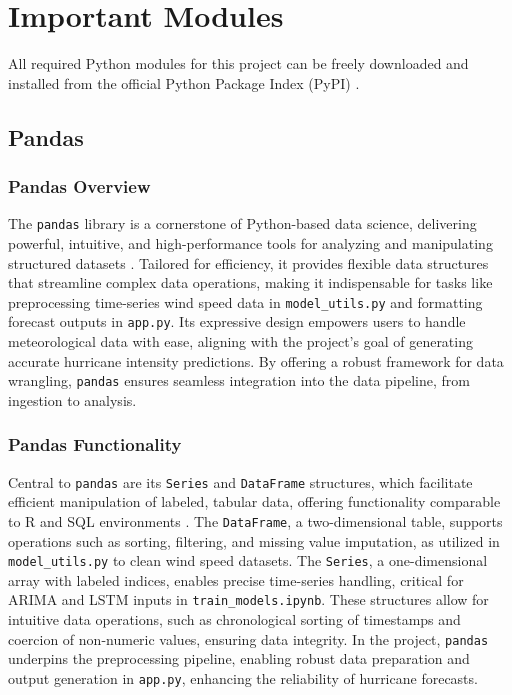 %
%
%

\chapter{Important Modules}

All required Python modules for this project can be freely downloaded and installed from the official Python Package Index (PyPI) \cite{pythonpypi}.


\section{Pandas}
\subsection{Pandas Overview}
The \texttt{pandas} library is a cornerstone of Python-based data science, delivering powerful, intuitive, and high-performance tools for analyzing and manipulating structured datasets \cite{mckinney2011pandas}. Tailored for efficiency, it provides flexible data structures that streamline complex data operations, making it indispensable for tasks like preprocessing time-series wind speed data in \texttt{model\_utils.py} and formatting forecast outputs in \texttt{app.py}. Its expressive design empowers users to handle meteorological data with ease, aligning with the project's goal of generating accurate hurricane intensity predictions. By offering a robust framework for data wrangling, \texttt{pandas} ensures seamless integration into the data pipeline, from ingestion to analysis.

\subsection{Pandas Functionality}
Central to \texttt{pandas} are its \texttt{Series} and \texttt{DataFrame} structures, which facilitate efficient manipulation of labeled, tabular data, offering functionality comparable to R and SQL environments \cite{mckinney2011pandas}. The \texttt{DataFrame}, a two-dimensional table, supports operations such as sorting, filtering, and missing value imputation, as utilized in \texttt{model\_utils.py} to clean wind speed datasets. The \texttt{Series}, a one-dimensional array with labeled indices, enables precise time-series handling, critical for ARIMA and LSTM inputs in \texttt{train\_models.ipynb}. These structures allow for intuitive data operations, such as chronological sorting of timestamps and coercion of non-numeric values, ensuring data integrity. In the project, \texttt{pandas} underpins the preprocessing pipeline, enabling robust data preparation and output generation in \texttt{app.py}, enhancing the reliability of hurricane forecasts.
